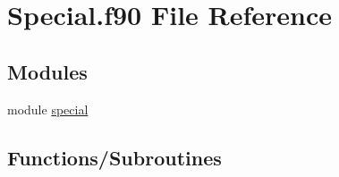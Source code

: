 \hypertarget{Special_8f90}{}\section{Special.\+f90 File Reference}
\label{Special_8f90}
\subsection*{Modules}
\begin{DoxyCompactItemize}
\item 
module \hyperlink{namespacespecial}{special}
\end{DoxyCompactItemize}
\subsection*{Functions/\+Subroutines}

